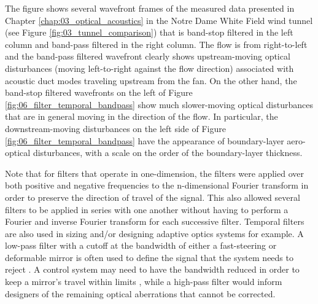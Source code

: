 The figure shows several wavefront frames of the measured data presented in Chapter \ref{chap:03_optical_acoustics} in the Notre Dame White Field wind tunnel (see Figure \ref{fig:03_tunnel_comparison}) that is band-stop filtered in the left column and band-pass filtered in the right column.
The flow is from right-to-left and the band-pass filtered wavefront clearly shows upstream-moving optical disturbances (moving left-to-right against the flow direction) associated with acoustic duct modes traveling upstream from the fan.
On the other hand, the band-stop filtered wavefronts on the left of Figure \ref{fig:06_filter_temporal_bandpass} show much slower-moving optical disturbances that are in general moving in the direction of the flow.
In particular, the downstream-moving disturbances on the left side of Figure \ref{fig:06_filter_temporal_bandpass} have the appearance of boundary-layer aero-optical disturbances, with a scale on the order of the boundary-layer thickness.

Note that for filters that operate in one-dimension, the filters were applied over both positive and negative frequencies to the n-dimensional Fourier transform in order to preserve the direction of travel of the signal.
This also allowed several filters to be applied in series with one another without having to perform a Fourier and inverse Fourier transform for each successive filter.
Temporal filters are also used in sizing and/or designing adaptive optics systems \cite{Greenwood-1977-aWDqUh6C} for example.
A low-pass filter with a cutoff at the bandwidth of either a fast-steering or deformable mirror is often used to define the signal that the system needs to reject \cite{Whiteley-2007-bHbWRWUu}.
A control system may need to have the bandwidth reduced in order to keep a mirror’s travel within limits \cite{Madec-2012-YJ8eWhPB}, while a high-pass filter would inform designers of the remaining optical aberrations that cannot be corrected.

